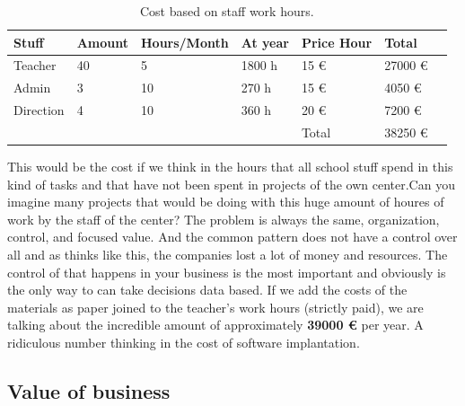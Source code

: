 \begin{table}[H]
\centering

\begin{tabular}{@{}lllllll@{}}

Stuff & Amount & Hours/Month & At year & Price Hour & Total  \\
\midrule

Teacher     & 40 & 5    & 1800 h   & 15 \euro  & 27000  \euro  \\
Admin       & 3  & 10   & 270 h   & 15 \euro  & 4050   \euro  \\
Direction   & 4  & 10   & 360 h   & 20 \euro  & 7200   \euro  \\

\midrule
& & & & Total & 38250 \euro \\
\end{tabular}
\caption{Cost based on staff work hours.}
\label{my-label}
\end{table}

\noindent This would be the cost if we think in the hours that all school stuff spend
in this kind of tasks and that have not been spent in projects of the own
center.Can you imagine many projects that would be doing with this huge
amount of houres of work by the staff of the center?
\intro
The problem is always the same, organization, control, and focused value. And
the common pattern does not have a control over all and as thinks like this,
the companies lost a lot of money and resources. The control of that happens in your
business is the most important and obviously is the only way to can take
decisions data based.
\intro
If we add the costs of the materials as paper joined to the teacher's work hours
(strictly paid), we are talking about the incredible amount of approximately
\textbf{39000 \euro} per year. A ridiculous number thinking in the cost of
software implantation.

\subsection{Value of business}

